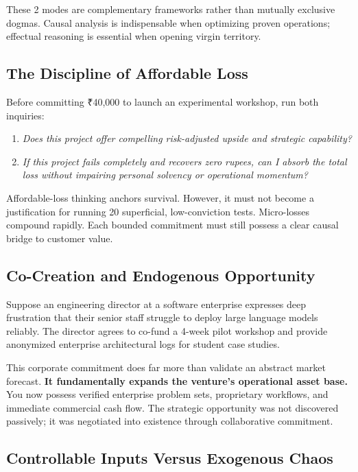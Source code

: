 These 2 modes are complementary frameworks rather than mutually exclusive dogmas. Causal analysis is indispensable when optimizing proven operations; effectual reasoning is essential when opening virgin territory.

\subsection{The Discipline of Affordable Loss}

Before committing ₹40,000 to launch an experimental workshop, run both inquiries:
\begin{enumerate}[leftmargin=12pt,itemsep=2pt,topsep=1pt,parsep=0pt]
  \item \textit{Does this project offer compelling risk-adjusted upside and strategic capability?}
  \item \textit{If this project fails completely and recovers zero rupees, can I absorb the total loss without impairing personal solvency or operational momentum?}
\end{enumerate}

Affordable-loss thinking anchors survival. However, it must not become a justification for running 20 superficial, low-conviction tests. Micro-losses compound rapidly. Each bounded commitment must still possess a clear causal bridge to customer value.

\subsection{Co-Creation and Endogenous Opportunity}

Suppose an engineering director at a software enterprise expresses deep frustration that their senior staff struggle to deploy large language models reliably. The director agrees to co-fund a 4-week pilot workshop and provide anonymized enterprise architectural logs for student case studies.

This corporate commitment does far more than validate an abstract market forecast. \textbf{It fundamentally expands the venture's operational asset base.} You now possess verified enterprise problem sets, proprietary workflows, and immediate commercial cash flow. The strategic opportunity was not discovered passively; it was negotiated into existence through collaborative commitment.

\subsection{Controllable Inputs Versus Exogenous Chaos}

